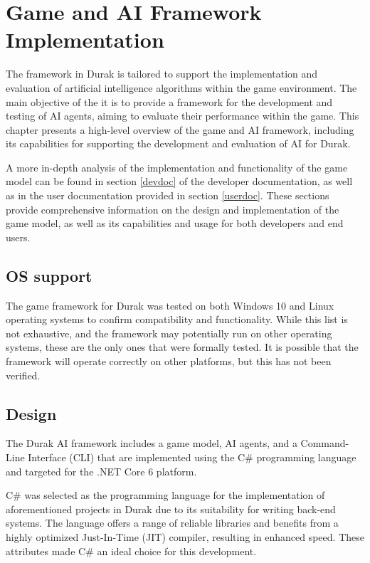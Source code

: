 \chapter{Game and AI Framework Implementation}

The framework in Durak is tailored to support the implementation and evaluation of artificial intelligence algorithms within the game environment. The main objective of the it is to provide a framework for the development and testing of AI agents, aiming to evaluate their performance within the game. This chapter presents a high-level overview of the game and AI framework, including its capabilities for supporting the development and evaluation of AI for Durak. 

A more in-depth analysis of the implementation and functionality of the game model can be found in section \ref{devdoc} of the developer documentation, as well as in the user documentation provided in section \ref{userdoc}. These sections provide comprehensive information on the design and implementation of the game model, as well as its capabilities and usage for both developers and end users.

\section{OS support}

The game framework for Durak was tested on both Windows 10 and Linux operating systems to confirm compatibility and functionality. While this list is not exhaustive, and the framework may potentially run on other operating systems, these are the only ones that were formally tested. It is possible that the framework will operate correctly on other platforms, but this has not been verified.

\section{Design}

The Durak AI framework includes a game model, AI agents, and a Command-Line Interface (CLI) that are implemented using the C\# programming language and targeted for the .NET Core 6 platform.

C\# was selected as the programming language for the implementation of aforementioned projects in Durak due to its suitability for writing back-end systems. The language offers a range of reliable libraries and benefits from a highly optimized Just-In-Time (JIT) compiler, resulting in enhanced speed. These attributes made C\# an ideal choice for this development.

